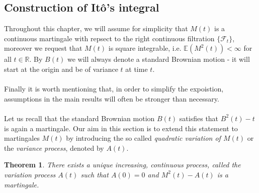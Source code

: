 \documentclass[11pt,a4paper, final]{article}
\newtheorem{thm}{Theorem}[section]
\theoremstyle{definition}
\begin{document}
\subsection{Construction of Itô's integral}
Throughout this chapter, we will assume for simplicity that $M(t)$ is a continuous martingale with repsect to the right continuous filtration $\lbrace \mathcal{F}_t \rbrace$, moreover we request that $M(t)$ is square integrable, i.e. $\mathbb{E}(M^2(t)) < \infty$ for all $t \in \mathbb{R}$. By $B(t)$ we will always denote a standard Brownian motion - it will start at the origin and be of variance $t$ at time $t$. 
\\\\
 Finally it is worth mentioning that, in order to simplify the expoistion, assumptions in the main results will often be stronger than necessary. 
\\
\\ 
Let us recall that the standard Brownian motion $B(t)$ satisfies that $B^2(t)-t$ is again a martingale. 
Our aim in this section is to extend this statement to martingales $M(t)$ by introducing the so called \textit{quadratic variation of $M(t)$} or the \textit{variance process}, denoted by $A(t)$.
\begin{thm}
There exists a unique increasing, continuous process, called the variation process $A(t)$ such that $A(0)=0$ and $M^2(t)-A(t)$ is a martingale.
\end{thm}
\end{document}
